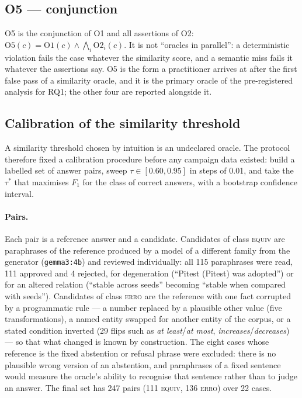 \documentclass[a4paper,fleqn]{cas-dc}
\newcommand{\code}[1]{\texttt{#1}}
\begin{document}
\subsection{O5 --- conjunction}
\label{sec:o5}

O5 is the conjunction of O1 and all assertions of O2:
$\mathrm{O5}(c) = \mathrm{O1}(c) \wedge \bigwedge_i \mathrm{O2}_i(c)$. It is
not ``oracles in parallel'': a deterministic violation fails the case whatever
the similarity score, and a semantic miss fails it whatever the assertions
say. O5 is the form a practitioner arrives at after the first false pass of a
similarity oracle, and it is the primary oracle of the pre-registered analysis
for RQ1; the other four are reported alongside it.

\subsection{Calibration of the similarity threshold}
\label{sec:calibration}

A similarity threshold chosen by intuition is an undeclared oracle. The
protocol therefore fixed a calibration procedure before any campaign data
existed: build a labelled set of answer pairs, sweep $\tau \in [0.60, 0.95]$
in steps of 0.01, and take the $\tau^\ast$ that maximises $F_1$ for the class
of correct answers, with a bootstrap confidence interval.

\paragraph{Pairs.} Each pair is a reference answer and a candidate. Candidates
of class \textsc{equiv} are paraphrases of the reference produced by a model of
a different family from the generator (\code{gemma3:4b}) and reviewed
individually: all 115 paraphrases were read, 111 approved and 4 rejected, for
degeneration (``Pitest (Pitest) was adopted'') or for an altered relation
(``stable across seeds'' becoming ``stable when compared with seeds'').
Candidates of class \textsc{erro} are the reference with one fact corrupted by
a programmatic rule --- a number replaced by a plausible other value (five
transformations), a named entity swapped for another entity of the corpus, or
a stated condition inverted (29 flips such as \emph{at least}/\emph{at most},
\emph{increases}/\emph{decreases}) --- so that what changed is known by
construction. The eight cases whose reference is the fixed abstention or
refusal phrase were excluded: there is no plausible wrong version of an
abstention, and paraphrases of a fixed sentence would measure the oracle's
ability to recognise that sentence rather than to judge an answer. The final
set has 247 pairs (111 \textsc{equiv}, 136 \textsc{erro}) over 22 cases.
\end{document}
